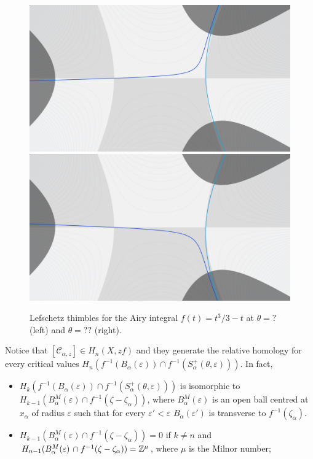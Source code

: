 \documentclass[11pt,a4paper,twoside,leqno,noamsfonts]{amsart}
\numberwithin{equation}{section}
\begin{document}
\begin{figure}[h]
\includegraphics[scale=0.075]{veer-left_matching}
\includegraphics[scale=0.075]{veer-right_matching}
\caption{Lefschetz thimbles for the Airy integral $f(t)=t^3/3-t$ at $\theta=?$ (left) and $\theta=??$ (right). }\label{Lefschetz_thimbles}
\end{figure}

Notice that $[\mathcal{C}_{\alpha,z}]\in H_n(X,zf)$ and they generate the relative homology for every critical values $H_n\left(f^{-1}(B_\alpha(\varepsilon))\cap f^{-1}(S_\alpha^+(\theta,\varepsilon))\right)$. In fact,  

\begin{itemize}
\item $H_k\left(f^{-1}(B_\alpha(\varepsilon))\cap f^{-1}(S_\alpha^+(\theta,\varepsilon))\right)$ is isomorphic to $H_{k-1}(B_\alpha^M(\varepsilon)\cap f^{-1}(\zeta-\zeta_\alpha))$, where $B_\alpha
^M(\varepsilon)$ is an open ball centred at $x_\alpha$ of radius $\varepsilon$ such that for every $\varepsilon'<\varepsilon$ $B_\alpha(\varepsilon')$ is transverse to $f^{-1}(\zeta_\alpha)$. 
\item $H_{k-1}(B_\alpha^M(\varepsilon)\cap f^{-1}(\zeta-\zeta_\alpha))=0$ if $k\neq n$ and $H_{n-1}(B_\alpha^M(\varepsilon)\,\cap f^{-1}(\zeta-\zeta_\alpha))=\mathbb Z^\mu$, where $\mu$ is the Milnor number;   
\end{itemize}
\end{document}
